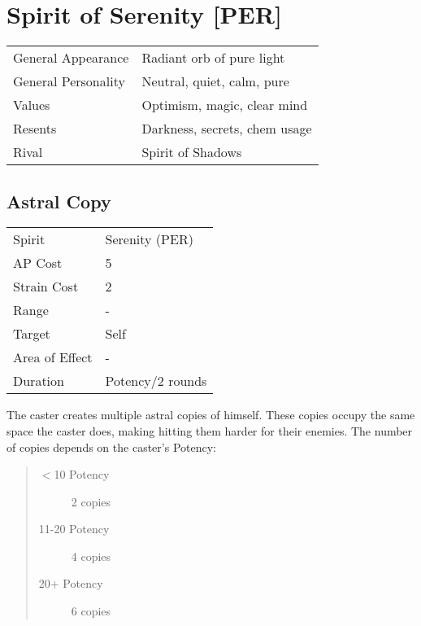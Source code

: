 \documentclass[11pt,a4paper,twocolumn]{book}
\begin{document}
\section*{Spirit of Serenity [PER]}
{
	\begin{tabu} to 75mm{| X[l,4] | X[l,8] |}
		\hline
		General Appearance  & Radiant orb of pure light     \\
		General Personality & Neutral, quiet, calm, pure    \\
		Values              & Optimism, magic, clear mind   \\
		Resents             & Darkness, secrets, chem usage \\
		Rival               & Spirit of Shadows             \\ \hline
	\end{tabu}
	
}
\medskip

\subsection*{Astral Copy}
{
	\begin{tabu} to 70mm{| X[l,4] | X[l,7] |}
		\hline
		Spirit         & Serenity (PER)        \\
		AP Cost        & 5                     \\
		Strain Cost    & 2                     \\
		Range          & -                     \\
		Target         & Self                  \\
		Area of Effect & -                     \\
		Duration       & Potency/2 rounds \\ \hline
	\end{tabu}
	
}
\medskip

The caster creates multiple astral copies of himself. These copies occupy the same space the caster does, making hitting them harder for their enemies. The number of copies depends on the caster's Potency:

\begin{quote}
	\begin{description}
		\item[$<$10 Potency] 	2 copies
		\item[11-20 Potency] 4 copies
		\item[20+ Potency] 	    6 copies
	\end{description}	
\end{quote}
\end{document}
